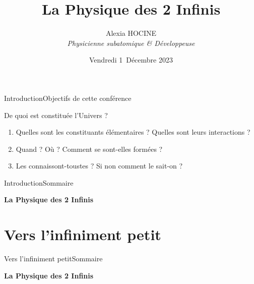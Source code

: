 \documentclass[handout,8pt]{beamer} %
\title{La Physique des 2 Infinis}
\author[A. Hocine]{Alexia HOCINE\\ \textit{Physicienne subatomique \& Développeuse}}
\institute[LVA]{Les Vendredis de l'Astronomie}
\date[2023]{Vendredi 1\ier\ Décembre 2023}
\begin{document}

\begin{frame}
	\titlepage
\end{frame}


\begin{frame}{Introduction}{Objectifs de cette conférence}
	\begin{center}
		\begin{Large}
			De quoi est constituée l'Univers ?
		\end{Large}
	\end{center}
	
	\begin{enumerate}
		\pause
		\item Quelles sont les constituants élémentaires ? Quelles sont leurs interactions ?
		\pause
		\item Quand ? Où ? Comment se sont-elles formées ?
		\pause
		\item Les connaissont-toustes ? Si non comment le sait-on ?
	\end{enumerate}
\end{frame}

\begin{frame}{Introduction}{Sommaire}
	\begin{center}
		\begin{Large}
			\textbf{La Physique des 2 Infinis}
		\end{Large}
	\end{center}

	\tableofcontents[hideallsubsections] %
\end{frame}


\section{Vers l’infiniment petit}
\begin{frame}{Vers l’infiniment petit}{Sommaire}
	\begin{center}
		\begin{Large}
			\textbf{La Physique des 2 Infinis}
		\end{Large}
	\end{center}
\end{frame}
\end{document}
